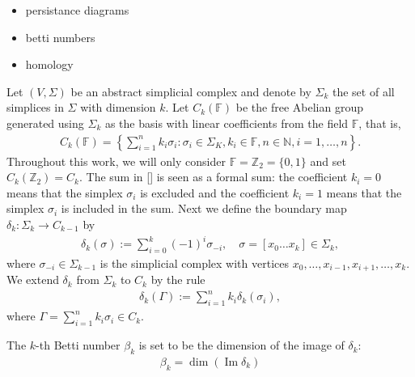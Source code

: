 \begin{itemize}
    \item persistance diagrams
    \item betti numbers
    \item homology
\end{itemize}


Let $(V,\Sigma)$ be an abstract simplicial complex and denote by $\Sigma_k$ the set of all simplices in $\Sigma$ with dimension $k$. Let $C_k(\mathbb{F})$ be the free Abelian group generated using $\Sigma_k$ as the basis with linear coefficients from the field $\mathbb{F}$, that is,
\begin{align*}
    C_k(\mathbb{F})=\left\{\sum_{i=1}^{n}k_i\sigma_i:\sigma_i\in\Sigma_K,k_i\in\mathbb{F},n\in\mathbb{N},i=1,\dots,n\right\}.
\end{align*}
Throughout this work, we will only consider $\mathbb{F}=\mathbb{Z}_2=\{0,1\}$ and set $C_k(\mathbb{Z}_2)=C_k$. The sum in [] is seen as a formal sum: the coefficient $k_i=0$ means that the simplex $\sigma_i$ is excluded and the coefficient $k_i=1$ means that the simplex $\sigma_i$ is included in the sum. Next we define the boundary map $\delta_k:\Sigma_k\to C_{k-1}$ by
\begin{align*}
    \delta_k(\sigma):=\sum_{i=0}^{k}(-1)^{i}\sigma_{-i},\quad\sigma=[x_0\dots x_k]\in\Sigma_k,
\end{align*}
where $\sigma_{-i}\in\Sigma_{k-1}$ is the simplicial complex with vertices $x_0,\dots,x_{i-1},x_{i+1},\dots,x_k$. We extend $\delta_k$ from $\Sigma_k$ to $C_k$ by the rule
\begin{align*}
    \delta_k(\Gamma):=\sum_{i=1}^{n}k_i\delta_k(\sigma_i),
\end{align*}
where $\Gamma=\sum_{i=1}^{n}k_i\sigma_i\in C_k$.

The $k$-th Betti number $\beta_k$ is set to be the dimension of the image of $\delta_k$:
\begin{align*}
    \beta_k=\dim(\operatorname{Im}\delta_k)
\end{align*}